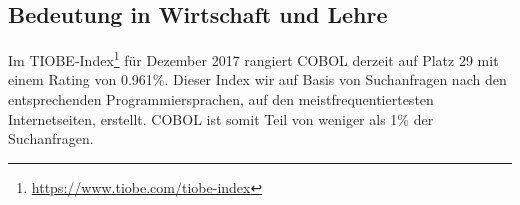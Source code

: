 
\subsection{Bedeutung in Wirtschaft und Lehre}

Im TIOBE-Index\footnote{\url{https://www.tiobe.com/tiobe-index}} für Dezember 2017 rangiert COBOL derzeit auf Platz 29 mit einem Rating von 0.961\%. Dieser Index wir auf Basis von Suchanfragen nach den entsprechenden Programmiersprachen, auf den meistfrequentiertesten Internetseiten, erstellt. COBOL ist somit Teil von weniger als 1\% der Suchanfragen.


